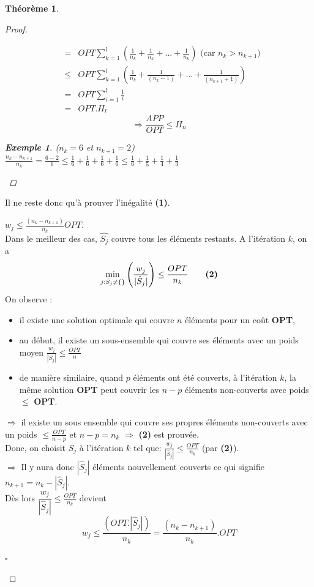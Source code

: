 \documentclass[12pt]{article}
\newcommand{\cqfd}{\begin{flushright}$\square$\end{flushright}}
\newtheorem{exemple}{Exemple}[section]
\newtheorem{thm}{Th\'eor\`eme}[section]
\newtheorem{proof}{Preuve}[section]
\begin{document}
\begin{thm}
\begin{proof}
\begin{itemize}
$$\begin{eqnarray}
	& = & OPT \sum_{k=1}^l \left(\frac{1}{n_k} + \frac{1}{n_k} + \ldots +
	  \frac{1}{n_k}\right) \text{ (car $n_k > n_{k+1}$)}\\
	& \leq & OPT \sum_{k=1}^l \left(\frac{1}{n_k} + \frac{1}{(n_k-1)} +\ldots +
          \frac{1}{(n_{k+1}+1)}\right)\\
	& = & OPT \sum_{i=1}^l \frac{1}{i} \\
	& = & OPT.H_l
\end{eqnarray}$$ $$\Rightarrow \frac{APP}{OPT} \leq H_n$$
\begin{exemple}($n_k=6$ et $n_{k+1}=2$) \\
$\frac{n_k - n_{k+1}}{n_k}=\frac{6-2} 6 \leq \frac 1 6 +\frac 1 6 +\frac 1 6 +
\frac 1 6 \leq \frac 1 6 +\frac 1 5 +\frac 1 4 +\frac 1 3$
\end{exemple}
\end{itemize}
\end{proof}
\end{thm}

Il ne reste donc qu'à prouver l'inégalité \textbf{(1)}. \\



\begin{proof}[$w_j \leq \frac{(n_k - n_{k+1})}{n_k}OPT$]$ $\\
Dans le meilleur des cas, $\hat{S_j}$ couvre tous les éléments restants.
A l'itération $k$, on a
$$ \min_{j:\hat{S}_j \neq \{\}} \left(\frac{w_j}{|\hat{S}_j|}\right) \leq
\frac{OPT}{n_k}\qquad \text{\textbf{(2)}}$$
On observe :
\begin{itemize}
\item il existe une solution optimale qui couvre $n$ éléments pour un coût
\textbf{OPT},
\item au début, il existe un sous-ensemble qui couvre ses éléments avec un poids
moyen $\frac{w_j}{|S_j|} \leq \frac{OPT}{n}$
\item de manière similaire, quand $p$ éléments ont été couverts, à l'itération
$k$, la même solution \textbf{OPT} peut couvrir les
$n-p$ éléments non-couverts avec poids $\leq$ \textbf{OPT}.
\end{itemize}
$\Rightarrow$ il existe un sous ensemble qui couvre ses propres éléments
non-couverts avec un poids $\leq \frac{OPT}{n-p}$ et $n-p = n_k$ $\Rightarrow$
\textbf{(2)} est prouvée. \\

\noindent Donc, on choisit $S_j$ à l'itération $k$ tel que:
$\frac{w_j}{|\hat{S}_j|} \leq \frac{OPT}{n_k}$ (par \textbf{(2)}).\\
$\Longrightarrow$ Il y aura donc $|\hat{S}_j|$ éléments nouvellement couverts ce
qui signifie $n_{k+1} = n_k-|\hat{S}_j| $. \\
Dès lors $\dfrac{w_j}{|\hat{S}_j|} \leq \frac{OPT}{n_k}$ devient
$$w_j \leq \frac{(OPT.|\hat{S}_j|)}{n_k} = \frac{(n_k-n_{k+1})}{n_k}.OPT$$

\cqfd
\end{proof}
\end{document}
